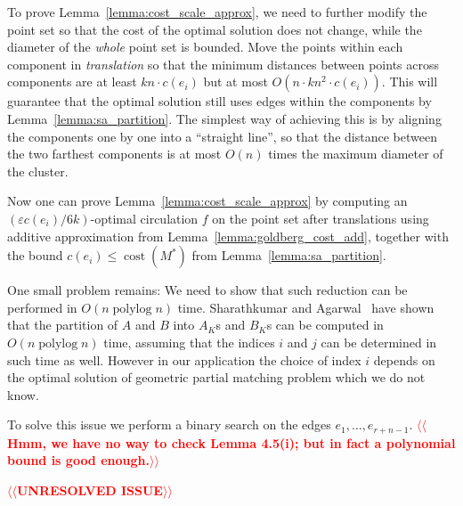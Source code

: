 \documentclass[a4paper,UKenglish]{socg-lipics-v2018}
\makeatletter
\def\note#1{\textcolor{red}{{#1}}}
\def\polylog{\mathop{\mathrm{polylog}}}
\def\eps{\varepsilon}
\def\cost{\operatorname{cost}}
\theoremstyle{plain}
\numberwithin{figure}{section}
\def\n@te#1{\textsf{\boldmath \textbf{$\langle\!\langle$#1$\rangle\!\rangle$}}\leavevmode}
\def\note#1{\textcolor{red}{\n@te{#1}}}
\makeatother
\begin{document}
\begin{toappendix}
To prove Lemma~\ref{lemma:cost_scale_approx}, we need to further modify the point set so that the cost of the optimal solution does not change, while the diameter of the \emph{whole} point set is bounded.
%
Move the points within each component in \emph{translation} so that the minimum distances between points across components are at least $kn \cdot c(e_i)$ but at most $O(n \cdot kn^2 \cdot c(e_i))$.
This will guarantee that the optimal solution still uses edges within the components by Lemma~\ref{lemma:sa_partition}.
The simplest way of achieving this is by aligning the components one by one into a ``straight line'', so that the distance between the two farthest components is at most $O(n)$ times the maximum diameter of the cluster.

Now one can prove Lemma~\ref{lemma:cost_scale_approx} by computing an $(\eps c(e_i)/6k)$-optimal
circulation $f$ on the point set after translations using additive approximation from Lemma~\ref{lemma:goldberg_cost_add}, together with the bound $c(e_i) \leq \cost(M^*)$ from
Lemma~\ref{lemma:sa_partition}.


One small problem remains: We need to show that such reduction can be performed in $O(n\polylog n)$ time.
Sharathkumar and Agarwal~\cite{SA12} have shown that the partition of $A$ and $B$ into $A_K$s and $B_K$s can be computed in $O(n \polylog n)$ time, assuming that the indices $i$ and $j$ can be determined in such time as well.  However in our application the choice of index $i$ depends on the optimal solution of geometric partial matching problem which we do not know.

To solve this issue we perform a binary search on the edges $e_1, \ldots, e_{r+n-1}$.  \note{Hmm, we have no way to check Lemma 4.5(i); but in fact a polynomial bound is good enough.}

\note{UNRESOLVED ISSUE}



\end{toappendix}
\end{document}
